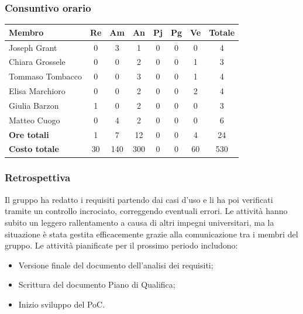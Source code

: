 \documentclass[11pt,a4paper]{article}
\begin{document}
\subsubsection{Consuntivo orario}
\begin{center}
    \begin{tabular}{|l|c|c|c|c|c|c|c|}
        \hline
        \textbf{Membro} & \textbf{Re} & \textbf{Am} & \textbf{An} & \textbf{Pj} & \textbf{Pg} & \textbf{Ve} & \textbf{Totale} \\
        \hline
        Joseph Grant & 0 & 3 & 1 & 0 & 0 & 0 & 4 \\
        \hline
        Chiara Grossele & 0 & 0 & 2 & 0 & 0 & 1 & 3 \\
        \hline
        Tommaso Tombacco & 0 & 0 & 3 & 0 & 0 & 1 & 4 \\
        \hline
        Elisa Marchioro & 0 & 0 & 2 & 0 & 0 & 2 & 4 \\
        \hline
        Giulia Barzon & 1 & 0 & 2 & 0 & 0 & 0 & 3 \\
        \hline
        Matteo Cuogo & 0 & 4 & 2 & 0 & 0 & 0 & 6 \\
        \hline
        \textbf{Ore totali} & 1 & 7 & 12 & 0 & 0 & 4 & 24 \\
        \hline
        \textbf{Costo totale} & 30 & 140 & 300 & 0 & 0 & 60 & 530 \\
        \hline
    \end{tabular}
\end{center}

\subsubsection{Retrospettiva}
Il gruppo ha redatto i requisiti partendo dai casi d’uso e li ha poi verificati tramite un controllo incrociato, correggendo eventuali errori.
Le attività hanno subito un leggero rallentamento a causa di altri impegni universitari, ma la situazione è stata gestita efficacemente grazie alla comunicazione tra i membri del gruppo.
Le attività pianificate per il prossimo periodo includono:
\begin{itemize}
    \item Versione finale del documento dell'analisi dei requisiti;
    \item Scrittura del documento Piano di Qualifica;
    \item Inizio sviluppo del PoC.
\end{itemize}

\newpage
\end{document}
